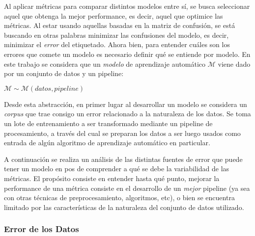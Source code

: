 Al aplicar métricas para comparar distintos modelos entre sí, se busca seleccionar aquel que obtenga la mejor performance, es decir, aquel que optimice las métricas. Al estar usando aquellas basadas en la matriz de confusión, se está buscando en otras palabras minimizar las confusiones del modelo, es decir, minimizar el \textit{error} del etiquetado.
Ahora bien, para entender cuáles son los errores que comete un modelo es necesario definir qué se entiende por modelo. En este trabajo se considera que un \textit{modelo} de aprendizaje automático $\mathscr{M}$ viene dado por un conjunto de datos y un pipeline:

\bigskip
\centerline{$\mathscr{M} \sim \mathscr{M}(datos, pipeline)$}
\bigskip


Desde esta abstracción, en primer lugar al desarrollar un modelo se considera un \textit{corpus} que trae consigo un error relacionado a la naturaleza de los datos. Se toma un lote de entrenamiento a ser transformado mediante un pipeline de procesamiento, a través del cual se preparan los datos a ser luego usados como entrada de algún algoritmo de aprendizaje automático en particular. 

A continuación se realiza un análisis de las distintas fuentes de error que puede tener un modelo en pos de comprender a qué se debe la variabilidad de las métricas. El propósito consiste en entender hasta qué punto, mejorar la performance de una métrica consiste en el desarrollo de un \textit{mejor} pipeline (ya sea con otras técnicas de preprocesamiento, algoritmos, etc), o bien se encuentra limitado por las características de la naturaleza del conjunto de datos utilizado.

\subsubsection{Error de los Datos} \label{ruido_datos}




